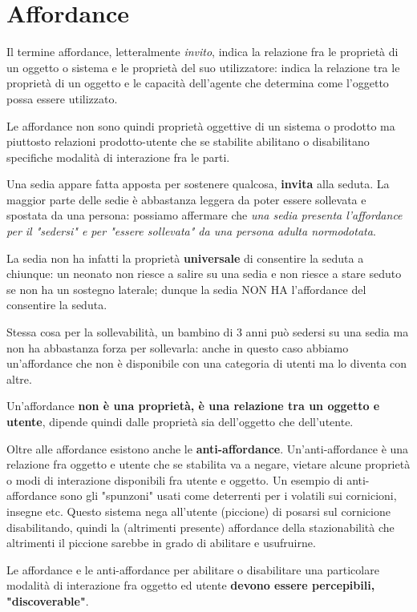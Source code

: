 \section{Affordance}
Il termine affordance, letteralmente \textit{invito}, indica la relazione fra le proprietà di un oggetto o sistema e le proprietà del suo utilizzatore:
indica la relazione tra le proprietà di un oggetto e le capacità dell'agente che determina come l'oggetto possa essere utilizzato.

Le affordance non sono quindi proprietà oggettive di un sistema o prodotto ma piuttosto relazioni prodotto-utente che se stabilite abilitano o
disabilitano specifiche modalità di interazione fra le parti.

Una sedia appare fatta apposta per sostenere qualcosa, \textbf{invita} alla seduta. La maggior parte delle sedie è abbastanza leggera da poter
essere sollevata e spostata da una persona: possiamo affermare che \textit{una sedia presenta l'affordance per il "sedersi" e per "essere
sollevata" da una persona adulta normodotata}.

La sedia non ha infatti la proprietà \textbf{universale} di consentire la seduta a chiunque: un neonato non riesce a salire su una sedia e non riesce a
stare seduto se non ha un sostegno laterale; dunque la sedia NON HA l'affordance del consentire la seduta.

Stessa cosa per la sollevabilità, un bambino di 3 anni può sedersi su una sedia ma non ha abbastanza forza per sollevarla: anche in questo caso
abbiamo un'affordance che non è disponibile con una categoria di utenti ma lo diventa con altre.

Un'affordance \textbf{non è una proprietà, è una relazione tra un oggetto e utente}, dipende quindi dalle proprietà sia dell'oggetto che dell'utente.

Oltre alle affordance esistono anche le \textbf{anti-affordance}. Un'anti-affordance è una relazione fra oggetto e utente che se stabilita va a negare,
vietare alcune proprietà o modi di interazione disponibili fra utente e oggetto.
Un esempio di anti-affordance sono gli "spunzoni" usati come deterrenti per i volatili sui cornicioni, insegne etc. Questo sistema nega all'utente
(piccione) di posarsi sul cornicione disabilitando, quindi la (altrimenti presente) affordance della stazionabilità che altrimenti il piccione
sarebbe in grado di abilitare e usufruirne.

Le affordance e le anti-affordance per abilitare o disabilitare una particolare modalità di interazione fra oggetto ed utente \textbf{devono essere
percepibili, "discoverable"}.

